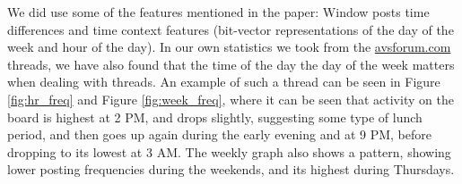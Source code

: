 We did use some of the features mentioned in the paper: Window posts time 
differences and time context features (bit-vector representations of the day of 
the week and hour of the day). In our own statistics we took from the 
\url{avsforum.com} threads, 
we have also found that the time of the day the day 
of the week matters when dealing with threads. An example of such a thread can 
be seen in Figure \ref{fig:hr_freq} and Figure \ref{fig:week_freq}, where it can 
be seen that activity on the board is highest at 2 PM, and drops slightly, 
suggesting some type of lunch period, and then goes up again during the early 
evening and at 9 PM, before dropping to its lowest at 3 AM. The weekly graph 
also shows a pattern, showing lower posting frequencies during the weekends, and 
its highest during Thursdays.

